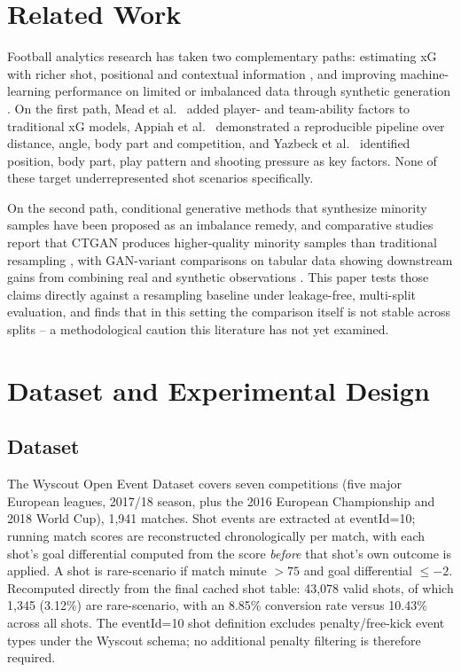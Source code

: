 \documentclass[conference,a4paper]{IEEEtran}
\begin{document}
\section{Related Work}
Football analytics research has taken two complementary paths: estimating xG with richer shot, positional and contextual information \cite{mead2023expected,appiah2026machine,yazbeck2025perfect}, and improving machine-learning performance on limited or imbalanced data through synthetic generation \cite{majeed2023ctgan,zhou2024addressing,ahmed2025synthetic}. On the first path, Mead et al.~\cite{mead2023expected} added player- and team-ability factors to traditional xG models, Appiah et al.~\cite{appiah2026machine} demonstrated a reproducible pipeline over distance, angle, body part and competition, and Yazbeck et al.~\cite{yazbeck2025perfect} identified position, body part, play pattern and shooting pressure as key factors. None of these target underrepresented shot scenarios specifically.

On the second path, conditional generative methods that synthesize minority samples \cite{majeed2023ctgan} have been proposed as an imbalance remedy, and comparative studies report that CTGAN produces higher-quality minority samples than traditional resampling \cite{zhou2024addressing}, with GAN-variant comparisons on tabular data showing downstream gains from combining real and synthetic observations \cite{ahmed2025synthetic}. This paper tests those claims directly against a resampling baseline under leakage-free, multi-split evaluation, and finds that in this setting the comparison itself is not stable across splits -- a methodological caution this literature has not yet examined.


\section{Dataset and Experimental Design}
\label{sec:dataset}

\subsection{Dataset}
The Wyscout Open Event Dataset covers seven competitions (five major European leagues, 2017/18 season, plus the 2016 European Championship and 2018 World Cup), 1,941 matches. Shot events are extracted at eventId=10; running match scores are reconstructed chronologically per match, with each shot's goal differential computed from the score \emph{before} that shot's own outcome is applied. A shot is rare-scenario if match minute $>75$ and goal differential $\le -2$. Recomputed directly from the final cached shot table: 43,078 valid shots, of which 1,345 (3.12\%) are rare-scenario, with an 8.85\% conversion rate versus 10.43\% across all shots. The eventId=10 shot definition excludes penalty/free-kick event types under the Wyscout schema; no additional penalty filtering is therefore required.
\end{document}

